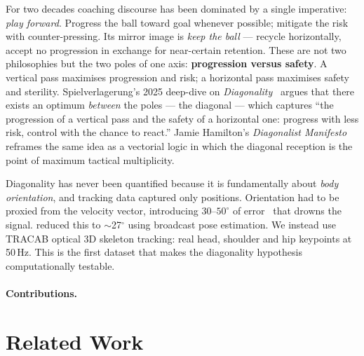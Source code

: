 \documentclass[11pt]{article}
\begin{document}
For two decades coaching discourse has been dominated by a single
imperative: \emph{play forward}. Progress the ball toward goal whenever
possible; mitigate the risk with counter-pressing. Its mirror image is
\emph{keep the ball} --- recycle horizontally, accept no progression in
exchange for near-certain retention. These are not two philosophies but the
two poles of one axis: \textbf{progression versus safety}. A vertical pass
maximises progression and risk; a horizontal pass maximises safety and
sterility. Spielverlagerung's 2025 deep-dive on
\emph{Diagonality}~\citep{spielverlagerung2025} argues that there exists an
optimum \emph{between} the poles --- the diagonal --- which captures
``the progression of a vertical pass and the safety of a horizontal one:
progress with less risk, control with the chance to react.'' Jamie
Hamilton's \emph{Diagonalist Manifesto}~\citep{hamilton2024} reframes the
same idea as a vectorial logic in which the diagonal reception is the point
of maximum tactical multiplicity.

Diagonality has never been quantified because it is fundamentally about
\emph{body orientation}, and tracking data captured only positions.
Orientation had to be proxied from the velocity vector, introducing
$30$--$50^\circ$ of error~\citep{arbues2020} that drowns the signal.
\citet{bekkers2026} reduced this to $\sim$27$^\circ$ using broadcast pose
estimation. We instead use TRACAB optical 3D skeleton tracking: real head,
shoulder and hip keypoints at 50\,Hz. This is the first dataset that makes
the diagonality hypothesis computationally testable.

\paragraph{Contributions.}

\section{Related Work}
\label{sec:related}

\end{document}
